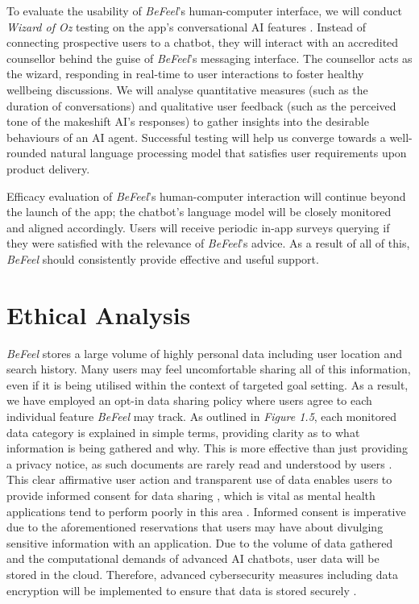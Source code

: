 \documentclass[acmsmall, screen, nonacm, 9pt, a4paper,top=2cm,bottom=2cm,left=1cm,right=1cm, marginparwidth=1cm]{acmart}
\begin{document}
To evaluate the usability of \emph{BeFeel}'s human-computer interface, we will conduct \emph{Wizard of Oz} testing on the app’s conversational AI features \cite{NielsonNormanTheUX}. Instead of connecting prospective users to a chatbot, they will interact with an accredited counsellor behind the guise of \emph{BeFeel}’s messaging interface. The counsellor acts as the wizard, responding in real-time to user interactions to foster healthy wellbeing discussions. We will analyse quantitative measures (such as the duration of conversations) and qualitative user feedback (such as the perceived tone of the makeshift AI's responses) to gather insights into the desirable behaviours of an AI agent. Successful testing will help us converge towards a well-rounded natural language processing model that satisfies user requirements upon product delivery.

Efficacy evaluation of \emph{BeFeel}’s human-computer interaction will continue beyond the launch of the app; the chatbot’s language model will be closely monitored and aligned accordingly. Users will receive periodic in-app surveys querying if they were satisfied with the relevance of \emph{BeFeel}’s advice. As a result of all of this, \emph{BeFeel} should consistently provide effective and useful support.

\section{Ethical Analysis}
\emph{BeFeel} stores a large volume of highly personal data including user location and search history. Many users may feel uncomfortable sharing all of this information, even if it is being utilised within the context of targeted goal setting. As a result, we have employed an opt-in data sharing policy where users agree to each individual feature \emph{BeFeel} may track. As outlined in \emph{Figure 1.5}, each monitored data category is explained in simple terms, providing clarity as to what information is being gathered and why. This is more effective than just providing a privacy notice, as such documents are rarely read and understood by users \cite{LinklatersDoesLinklaters}. This clear affirmative user action and transparent use of data enables users to provide informed consent for data sharing \cite{GOV.UKApprovalGOV.UK}, which is vital as mental health applications tend to perform poorly in this area \cite{Iwaya2023OnDevelopment}. Informed consent is imperative due to the aforementioned reservations that users may have about divulging sensitive information with an application. Due to the volume of data gathered and the computational demands of advanced AI chatbots, user data will be stored in the cloud. Therefore, advanced cybersecurity measures including data encryption will be implemented to ensure that data is stored securely \cite{Singh2013ASecurity}.
\end{document}
